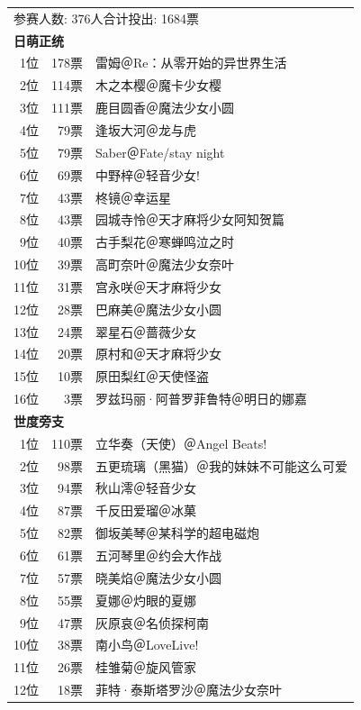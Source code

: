{\kai\begin{longtable}{rrl}
\multicolumn{3}{l}{参赛人数: 376人\quad 合计投出: 1684票} \\
\multicolumn{3}{l}{\bfseries 日萌正统 } \\
1位 & 178票 & 雷姆＠Re：从零开始的异世界生活 \\
2位 & 114票 & 木之本樱＠魔卡少女樱 \\
3位 & 111票 & 鹿目圆香＠魔法少女小圆 \\
4位 & 79票 & 逢坂大河＠龙与虎 \\
5位 & 79票 & Saber＠Fate/stay night \\
6位 & 69票 & 中野梓＠轻音少女! \\
7位 & 43票 & 柊镜＠幸运星 \\
8位 & 43票 & 园城寺怜＠天才麻将少女阿知贺篇 \\
9位 & 40票 & 古手梨花＠寒蝉鸣泣之时 \\
10位 & 39票 & 高町奈叶＠魔法少女奈叶 \\
11位 & 31票 & 宫永咲＠天才麻将少女 \\
12位 & 28票 & 巴麻美＠魔法少女小圆 \\
13位 & 24票 & 翠星石＠蔷薇少女 \\
14位 & 20票 & 原村和＠天才麻将少女 \\
15位 & 10票 & 原田梨红＠天使怪盗 \\
16位 & 3票 & 罗兹玛丽·阿普罗菲鲁特＠明日的娜嘉 \\
\multicolumn{3}{l}{\bfseries 世度旁支 } \\
1位 & 110票 & 立华奏（天使）＠Angel Beats! \\
2位 & 98票 & 五更琉璃（黑猫）＠我的妹妹不可能这么可爱 \\
3位 & 94票 & 秋山澪＠轻音少女 \\
4位 & 87票 & 千反田爱瑠＠冰菓 \\
5位 & 82票 & 御坂美琴＠某科学的超电磁炮 \\
6位 & 61票 & 五河琴里＠约会大作战 \\
7位 & 57票 & 晓美焰＠魔法少女小圆 \\
8位 & 55票 & 夏娜＠灼眼的夏娜 \\
9位 & 47票 & 灰原哀＠名侦探柯南 \\
10位 & 38票 & 南小鸟＠LoveLive! \\
11位 & 26票 & 桂雏菊＠旋风管家 \\
12位 & 18票 & 菲特·泰斯塔罗沙＠魔法少女奈叶 \\
\end{longtable}}

